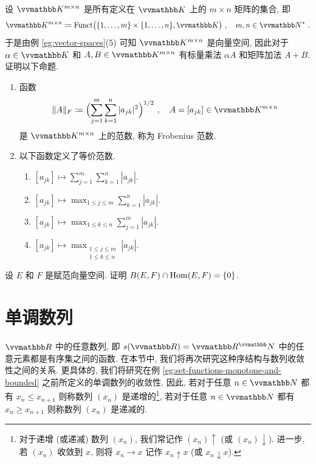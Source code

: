 \begin{exercise}\label{ex:norm-of-matrix}
    设 \(\K^{m \times n}\) 是所有定义在 \(\K\) 上的 \(m \times n\) 矩阵的集合, 即
    \[
        \K^{m \times n} \coloneqq \Funct\bigl(\{1, \ldots, m\} \times \{1, \ldots, n\}, \K\bigr)\ ,\quad m, n \in \N^\ast\ .
    \]
    于是由例 \ref{eg:vector-spaces}(5) 可知 \(\K^{m \times n}\) 是向量空间, 因此对于 \(\alpha \in \K\) 和 \(A, B \in \K^{m \times n}\) 有标量乘法 \(\alpha A\) 和矩阵加法 \(A + B\). 证明以下命题.
    \begin{enumerate}
        \item 函数
        \[
            \|A\|_F \coloneqq \Bigl(\sum_{j = 1}^m \sum_{k = 1}^n |a_{j k}|^2\Bigr)^{1 / 2}\ ,\quad A = [a_{j k}] \in \K^{m \times n}
        \]
        是 \(\K^{m \times n}\) 上的范数, 称为 Frobenius 范数.
        \item 以下函数定义了等价范数.
        \begin{enumerate}
            \item \([a_{j k}] \mapsto \sum_{j = 1}^m \sum_{k = 1}^n |a_{j k}|\).
            \item \([a_{j k}] \mapsto \max_{1 \leq j \leq m} \sum_{k = 1}^n |a_{j k}|\).
            \item \([a_{j k}] \mapsto \max_{1 \leq k \leq n} \sum_{j = 1}^m |a_{j k}|\).
            \item \([a_{j k}] \mapsto \max_{\substack{1 \leq j \leq m\\ 1 \leq k \leq n}} |a_{j k}|\).
        \end{enumerate}
    \end{enumerate}
\end{exercise}

\begin{exercise}
    设 \(E\) 和 \(F\) 是赋范向量空间. 证明 \(B(E, F) \cap \operatorname{Hom}(E, F) = \{0\}\).
\end{exercise}

\newpage

\section{单调数列}

\(\R\) 中的任意数列, 即 \(s(\R) = \R^\N\) 中的任意元素都是有序集之间的函数. 在本节中, 我们将再次研究这种序结构与数列收敛性之间的关系. 更具体的, 我们将研究在例 \ref{eg:set-functions-monotone-and-bounded} 之前所定义的单调数列的收敛性. 因此, 若对于任意 \(n \in \N\) 都有 \(x_n \leq x_{n + 1}\) 则称数列 \((x_n)\) 是递增的\footnote{对于递增 (或递减) 数列 \((x_n)\), 我们常记作 \((x_n) \uparrow\) (或 \((x_n) \downarrow\)). 进一步, 若 \((x_n)\) 收敛到 \(x\), 则将 \(x_n \to x\) 记作 \(x_n \uparrow x\) (或 \(x_n \downarrow x\)).}, 若对于任意 \(n \in \N\) 都有 \(x_n \geq x_{n + 1}\) 则称数列 \((x_n)\) 是递减的.

